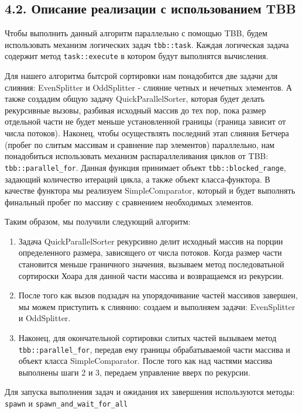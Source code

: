 \documentclass{report}
\begin{document}
\subsection*{4.2. Описание реализации с использованием TBB}
\par Чтобы выполнить данный алгоритм параллельно с помощью TBB, будем использовать механизм логических задач \verb|tbb::task|. Каждая логическая задача содержит метод \verb|task::execute| в котором будут выполнятся вычисления.
\par Для нашего алгоритма бытсрой сортировки нам понадобится две задачи для слияния: EvenSplitter и OddSplitter - слияние четных и нечетных элементов. А также создадим общую задачу QuickParallelSorter, которая будет делать рекурсивные вызовы, разбивая исходный массив до тех пор, пока размер отдельной части не будет меньше установленной границы (граница зависит от числа потоков). Наконец, чтобы осуществлять последний этап слияния Бетчера (пробег по слитым массивам и сравнение пар элементов) параллельно, нам понадобиться использовать механизм распараллеливания циклов от TBB: \verb|tbb::parallel_for|. Данная функция принимает объект \verb|tbb::blocked_range|, задающий количество итераций цикла, а также объект класса-функтора. В качестве функтора мы реализуем SimpleComparator, который и будет выполнять финальный пробег по массиву с сравнением необходимых элементов.
\par Таким образом, мы получили следующий алгоритм:
\begin{enumerate}
    \item Задача QuickParallelSorter рекурсивно делит исходный массив на порции определенного размера, зависящего от числа потоков. Когда размер части становится меньше граничного значения, вызываем метод последоватьной сортироски Хоара для данной части массива и возвращаемся из рекурсии.
    \item После того как вызов подзадач на упорядочивание частей массивов завершен, мы можем приступить к слиянию: создаем и выполняем задачи: EvenSplitter и OddSplitter.
    \item Наконец, для окончательной сортировки слитых частей вызываем метод \verb|tbb::parallel_for|, передав ему границы обрабатываемой части массива и объект класса SimpleComparator. После того как над частями массива выполнены шаги 2 и 3, передаем управление вверх по рекурсии.
\end{enumerate}
\par Для запуска выполнения задач и ожидания их завершения используются методы: \verb|spawn| и \verb|spawn_and_wait_for_all|
\end{document}
